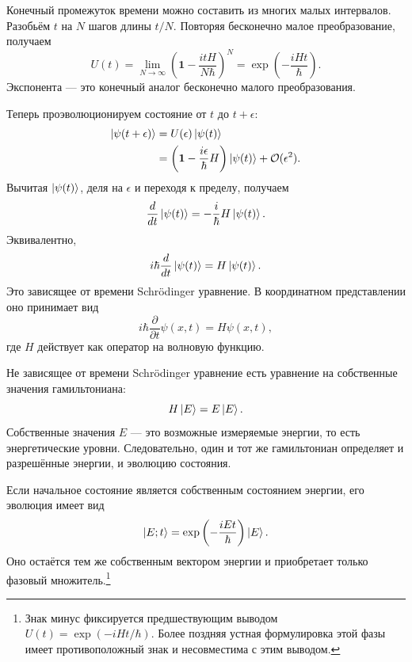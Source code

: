 Конечный промежуток времени можно составить из многих малых интервалов. Разобьём \(t\) на \(N\) шагов длины \(t/N\). Повторяя бесконечно малое преобразование, получаем
\begin{equation}
U(t)
=
\lim_{N\to\infty}
\left(
\mathbf 1-\frac{itH}{N\hbar}
\right)^N
=
\exp\left(-\frac{iHt}{\hbar}\right).
\end{equation}
Экспонента — это конечный аналог бесконечно малого преобразования.

Теперь проэволюционируем состояние от \(t\) до \(t+\epsilon\):
\begin{align}
\left\lvert\psi(t+\epsilon)\right\rangle
&=
U(\epsilon)\left\lvert\psi(t)\right\rangle
\\
&=
\left(
\mathbf 1-\frac{i\epsilon}{\hbar}H
\right)\left\lvert\psi(t)\right\rangle
+\mathcal O(\epsilon^2).
\end{align}
Вычитая \(\left\lvert\psi(t)\right\rangle\), деля на \(\epsilon\) и переходя к пределу, получаем
\begin{equation}
\frac{d}{dt}\left\lvert\psi(t)\right\rangle
=
-\frac{i}{\hbar}H\left\lvert\psi(t)\right\rangle.
\end{equation}
Эквивалентно,
\begin{equation}
i\hbar\frac{d}{dt}\left\lvert\psi(t)\right\rangle
=
H\left\lvert\psi(t)\right\rangle.
\end{equation}
Это зависящее от времени Schr\"odinger уравнение. В координатном представлении оно принимает вид
\begin{equation}
i\hbar\frac{\partial}{\partial t}\psi(x,t)
=
H\psi(x,t),
\end{equation}
где \(H\) действует как оператор на волновую функцию.

Не зависящее от времени Schr\"odinger уравнение есть уравнение на собственные значения гамильтониана:
\begin{equation}
H\left\lvert E\right\rangle=E\left\lvert E\right\rangle.
\end{equation}
Собственные значения \(E\) — это возможные измеряемые энергии, то есть энергетические уровни. Следовательно, один и тот же гамильтониан определяет и разрешённые энергии, и эволюцию состояния.

Если начальное состояние является собственным состоянием энергии, его эволюция имеет вид
\begin{equation}
\left\lvert E;t\right\rangle
=
\exp\left(-\frac{iEt}{\hbar}\right)\left\lvert E\right\rangle.
\end{equation}
Оно остаётся тем же собственным вектором энергии и приобретает только фазовый множитель.\footnote{Знак минус фиксируется предшествующим выводом \(U(t)=\exp(-iHt/\hbar)\). Более поздняя устная формулировка этой фазы имеет противоположный знак и несовместима с этим выводом.}

